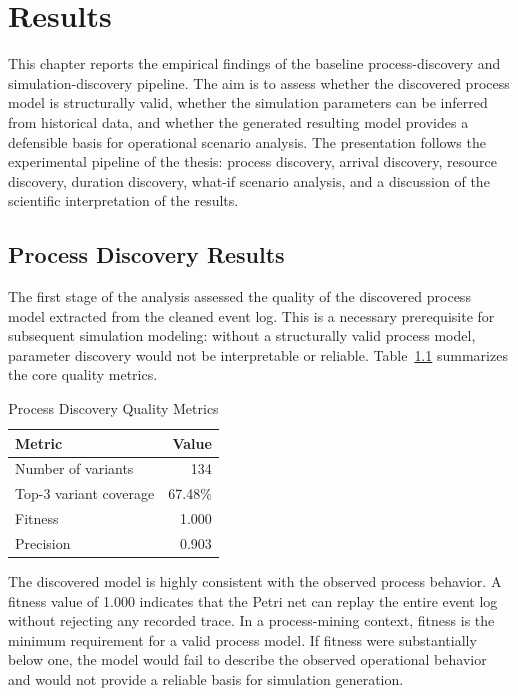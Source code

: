\chapter{Results}
\label{chap:results}

This chapter reports the empirical findings of the baseline process-discovery and simulation-discovery pipeline. The aim is to assess whether the discovered process model is structurally valid, whether the simulation parameters can be inferred from historical data, and whether the generated resulting model provides a defensible basis for operational scenario analysis. The presentation follows the experimental pipeline of the thesis: process discovery, arrival discovery, resource discovery, duration discovery, what-if scenario analysis, and a discussion of the scientific interpretation of the results.

\section{Process Discovery Results}
\label{sec:process_discovery_results}

The first stage of the analysis assessed the quality of the discovered process model extracted from the cleaned event log. This is a necessary prerequisite for subsequent simulation modeling: without a structurally valid process model, parameter discovery would not be interpretable or reliable. Table~\ref{tab:process_discovery_quality} summarizes the core quality metrics.

\begin{table}[h!]
\centering
\caption{Process Discovery Quality Metrics}
\label{tab:process_discovery_quality}
\begin{tabular}{lr}
\toprule
Metric & Value \\
\midrule
Number of variants & 134 \\
Top-3 variant coverage & 67.48\% \\
Fitness & 1.000 \\
Precision & 0.903 \\
\bottomrule
\end{tabular}
\end{table}

The discovered model is highly consistent with the observed process behavior. A fitness value of 1.000 indicates that the Petri net can replay the entire event log without rejecting any recorded trace. In a process-mining context, fitness is the minimum requirement for a valid process model. If fitness were substantially below one, the model would fail to describe the observed operational behavior and would not provide a reliable basis for simulation generation.

